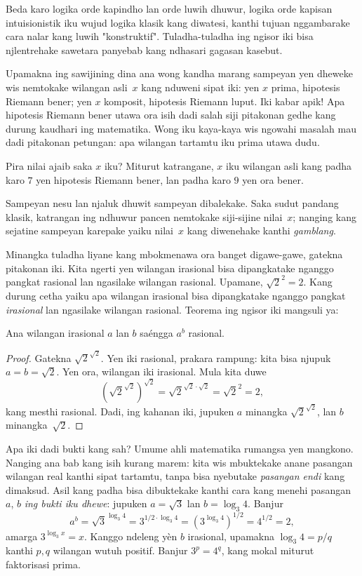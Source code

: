 \documentclass[../../../include/open-logic-section]{subfiles}
\begin{document}


Beda karo logika orde kapindho lan orde luwih dhuwur,
logika orde kapisan intuisionistik iku wujud
logika klasik kang diwatesi, kanthi tujuan
nggambarake cara nalar kang luwih "konstruktif".
Tuladha-tuladha ing ngisor iki bisa njlentrehake
sawetara panyebab kang ndhasari gagasan kasebut.

Upamakna ing sawijining dina ana wong kandha
marang sampeyan yen dheweke wis nemtokake
wilangan asli~$x$ kang nduweni sipat iki:
yen $x$ prima, hipotesis Riemann bener;
yen $x$ komposit, hipotesis Riemann luput.
Iki kabar apik!{} Apa hipotesis Riemann
bener utawa ora isih dadi salah siji
pitakonan gedhe kang durung kaudhari
ing matematika. Wong iku kaya-kaya wis
ngowahi masalah mau dadi pitakonan
petungan: apa wilangan tartamtu iku
prima utawa dudu.

Pira nilai ajaib saka $x$ iku?
Miturut katrangane, $x$ iku wilangan
asli kang padha karo $7$ yen
hipotesis Riemann bener, lan
padha karo $9$ yen ora bener.

Sampeyan nesu lan njaluk dhuwit
sampeyan dibalekake. Saka sudut
pandang klasik, katrangan ing
ndhuwur pancen nemtokake siji-sijine
nilai~$x$; nanging kang sejatine
sampeyan karepake yaiku nilai~$x$
kang diwenehake kanthi \emph{gamblang}.

Minangka tuladha liyane kang mbokmenawa
ora banget digawe-gawe, gatekna pitakonan
iki. Kita ngerti yen wilangan irasional
bisa dipangkatake nganggo pangkat rasional
lan ngasilake wilangan rasional.
Upamane, $\sqrt{2}^2 = 2$.
Kang durung cetha yaiku apa wilangan
irasional bisa dipangkatake nganggo
pangkat \emph{irasional} lan ngasilake
wilangan rasional. Teorema ing ngisor
iki mangsuli ya:

\begin{thm}
Ana wilangan irasional $a$ lan $b$
saéngga $a^b$ rasional.
\end{thm}

\begin{proof}
Gatekna $\sqrt{2}^{\sqrt{2}}$.
Yen iki rasional, prakara rampung:
kita bisa njupuk $a = b = \sqrt{2}$.
Yen ora, wilangan iki irasional.
Mula kita duwe
\[
(\sqrt{2}^{\sqrt{2}})^{\sqrt{2}} = \sqrt{2}^{\sqrt{2} \cdot
  \sqrt{2}} = \sqrt{2}^2 = 2,
\]
kang mesthi rasional. Dadi, ing kahanan
iki, jupuken $a$ minangka
$\sqrt{2}^{\sqrt{2}}$, lan
$b$ minangka~$\sqrt 2$.
\end{proof}

Apa iki dadi bukti kang sah?
Umume ahli matematika rumangsa
yen mangkono. Nanging ana bab
kang isih kurang marem: kita
wis mbuktekake anane pasangan
wilangan real kanthi sipat
tartamtu, tanpa bisa nyebutake
\emph{pasangan endi} kang dimaksud.
Asil kang padha bisa dibuktekake
kanthi cara kang menehi pasangan
$a$, $b$ \emph{ing bukti iku dhewe}:
jupuken $a = \sqrt{3}$ lan
$b = \log_3 4$. Banjur
\[
a^b = \sqrt{3}^{\log_3 4} = 3^{1/2 \cdot \log_3 4} = (3^{\log_3
  4})^{1/2} = 4^{1/2}= 2,
\]
amarga $3^{\log_3 x} = x$. Kanggo ndeleng yèn $b$ irasional, upamakna $\log_3 4=p/q$ kanthi $p,q$ wilangan wutuh positif. Banjur $3^p=4^q$, kang mokal miturut faktorisasi prima.
\end{document}
